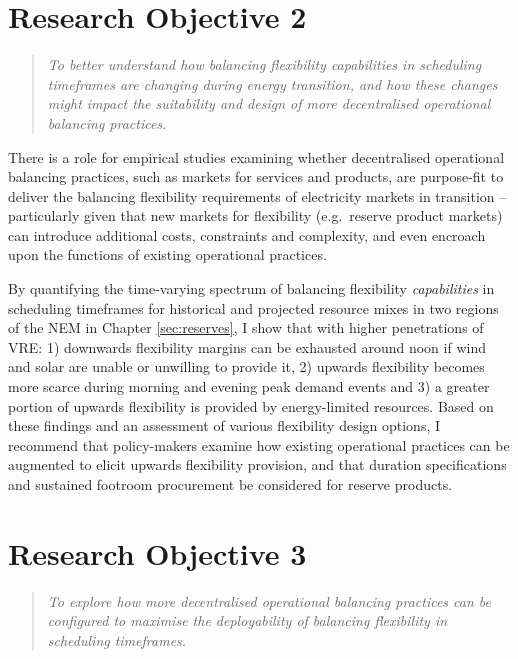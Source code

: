 \documentclass[12pt,a4paper,]{report}
\begin{document}
\hypertarget{sec:conclusion-ro2}{%
\section{Research Objective 2}\label{sec:conclusion-ro2}}

\begin{quote}
\emph{To better understand how balancing flexibility capabilities in
scheduling timeframes are changing during energy transition, and how
these changes might impact the suitability and design of more
decentralised operational balancing practices.}
\end{quote}

There is a role for empirical studies examining whether decentralised
operational balancing practices, such as markets for services and
products, are purpose-fit to deliver the balancing flexibility
requirements of electricity markets in transition -- particularly given
that new markets for flexibility (e.g.~reserve product markets) can
introduce additional costs, constraints and complexity, and even
encroach upon the functions of existing operational practices.

By quantifying the time-varying spectrum of balancing flexibility
\emph{capabilities} in scheduling timeframes for historical and
projected resource mixes in two regions of the NEM in Chapter
\ref{sec:reserves}, I show that with higher penetrations of VRE: 1)
downwards flexibility margins can be exhausted around noon if wind and
solar are unable or unwilling to provide it, 2) upwards flexibility
becomes more scarce during morning and evening peak demand events and 3)
a greater portion of upwards flexibility is provided by energy-limited
resources. Based on these findings and an assessment of various
flexibility design options, I recommend that policy-makers examine how
existing operational practices can be augmented to elicit upwards
flexibility provision, and that duration specifications and sustained
footroom procurement be considered for reserve products.

\hypertarget{sec:conclusion-ro3}{%
\section{Research Objective 3}\label{sec:conclusion-ro3}}

\begin{quote}
\emph{To explore how more decentralised operational balancing practices
can be configured to maximise the deployability of balancing flexibility
in scheduling timeframes.}
\end{quote}
\end{document}
